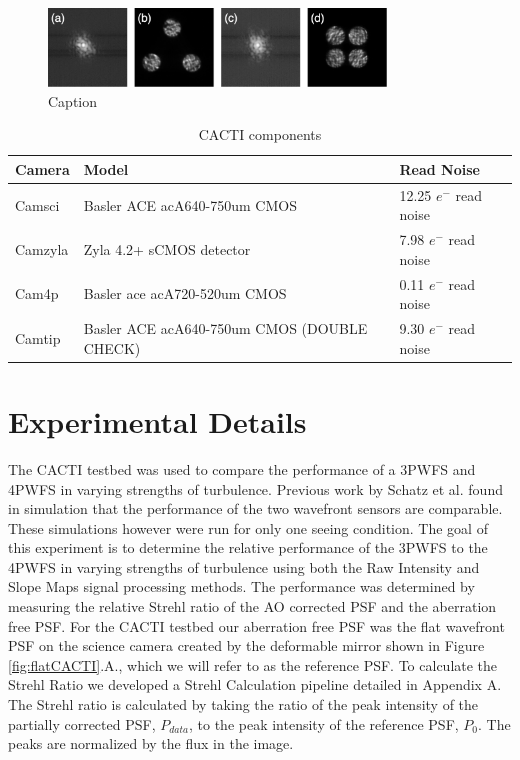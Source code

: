 \documentclass[12pt]{spieman}  %
\begin{document}
\begin{spacing}{2}
\begin{figure}
    \centering
    \includegraphics[width=0.8\textwidth]{turbCACTI.png}
    \caption{Caption}
    \label{fig:turbCACTI}
\end{figure}

\begin{table}
	\begin{center}
		\begin{tabular}{ | l|l|l | }
			\hline
			\textbf{Camera}& \textbf{Model} &\textbf{Read Noise}\\ \hline
             Camsci & Basler ACE acA640-750um CMOS  & 12.25 $e^-$ read noise\\ \hline
             Camzyla & Zyla 4.2+ sCMOS detector & 7.98 $e^-$ read noise \\ \hline
             Cam4p & Basler ace acA720-520um CMOS & 0.11 $e^-$ read noise \\ \hline
             Camtip & Basler ACE acA640-750um CMOS (DOUBLE CHECK)  & 9.30 $e^-$ read noise\\ \hline
				
			\end{tabular}
		\end{center}
	\caption{CACTI components}
	\label{tab:CACTItable}
\end{table}


\section{Experimental Details}

The CACTI testbed was used to compare the performance of a 3PWFS and 4PWFS in varying strengths of turbulence. Previous work by Schatz et al. found in simulation that the performance of the two wavefront sensors are comparable. These simulations however were run for only one seeing condition. The goal of this experiment is to determine the relative performance of the 3PWFS to the 4PWFS in varying strengths of turbulence using both the Raw Intensity and Slope Maps signal processing methods. The performance was determined by measuring the relative Strehl ratio of the AO corrected PSF and the aberration free PSF. For the CACTI testbed our aberration free PSF was the flat wavefront PSF on the science camera created by the deformable mirror shown in Figure \ref{fig:flatCACTI}.A., which we will refer to as the reference PSF. To calculate the Strehl Ratio we developed a Strehl Calculation pipeline detailed in Appendix A. The Strehl ratio is calculated by taking the ratio of the peak intensity of the partially corrected PSF, $P_{data}$,  to the peak intensity of the reference PSF, $P_0$. The peaks are normalized by the flux in the image. 


\end{spacing}
\end{document}
